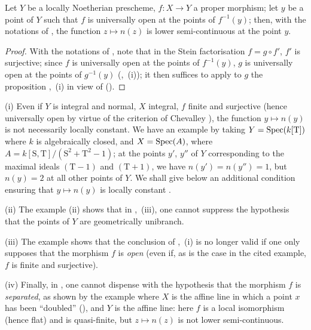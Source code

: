 \begin{corollary}[15.5.4]
\label{IV.15.5.4}
Let $Y$ be a locally Noetherian prescheme, $f:X\to Y$ a proper morphism; let $y$ be a point of $Y$ such that $f$ is universally open at the points of $f^{-1}(y)$;
then, with the notations of , the function $z\mapsto n(z)$ is lower semi-continuous at the point $y$.
\end{corollary}

\begin{proof}
With the notations of , note that in the Stein factorisation $f=g\circ f'$, $f'$ is surjective; since $f$ is universally open at the points of $f^{-1}(y)$, $g$ is universally open at the points of $g^{-1}(y)$ (,~(i)); it then suffices to apply to $g$ the proposition ,~(i) in view of ().
\end{proof}

\begin{remarks}[15.5.5]
\label{IV.15.5.5}
(i)
Even if $Y$ is integral and normal, $X$ integral, $f$ finite and surjective (hence universally open by virtue of the criterion of Chevalley ), the function $y\mapsto n(y)$ is not necessarily locally constant.
We have an example by taking $Y=\operatorname{Spec}(k[\mathrm{T}])$ where $k$ is algebraically closed, and $X=\operatorname{Spec}(A)$, where $A=k[\mathrm{S},\mathrm{T}]/(\mathrm{S}^2+\mathrm{T}^2-1)$; at the points $y'$, $y''$ of $Y$ corresponding to the maximal ideals $(\mathrm{T}-1)$ and $(\mathrm{T}+1)$, we have $n(y')=n(y'')=1$, but $n(y)=2$ at all other points of $Y$.
We shall give below an additional condition ensuring that $y\mapsto n(y)$ is locally constant .

(ii)
The example  (ii) shows that in ,~(iii), one cannot suppress the hypothesis that the points of $Y$ are geometrically unibranch.

(iii)
The example  shows that the conclusion of ,~(i) is no longer valid if one only supposes that the morphism $f$ is \emph{open} (even if, as is the case in the cited example, $f$ is finite and surjective).

(iv)
Finally, in , one cannot dispense with the hypothesis that the morphism $f$ is \emph{separated}, as shown by the example where $X$ is the affine line in which a point $x$ has been ``doubled'' (), and $Y$ is the affine line: here $f$ is a local isomorphism (hence flat) and is quasi-finite, but $z\mapsto n(z)$ is not lower semi-continuous.
\end{remarks}

